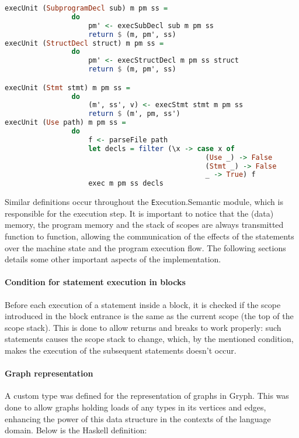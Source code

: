 \begin{lstlisting}[language=Haskell, basicstyle=\footnotesize]
execUnit (SubprogramDecl sub) m pm ss = 
                do 
                    pm' <- execSubDecl sub m pm ss
                    return $ (m, pm', ss)
execUnit (StructDecl struct) m pm ss = 
                do
                    pm' <- execStructDecl m pm ss struct
                    return $ (m, pm', ss)

execUnit (Stmt stmt) m pm ss = 
                do 
                    (m', ss', v) <- execStmt stmt m pm ss
                    return $ (m', pm, ss')
execUnit (Use path) m pm ss = 
                do
                    f <- parseFile path
                    let decls = filter (\x -> case x of    
                                                (Use _) -> False
                                                (Stmt _) -> False
                                                _ -> True) f
                    exec m pm ss decls
\end{lstlisting}

Similar definitions occur throughout the {\texttt Execution.Semantic} module, 
which is responsible for the execution step. It is important to notice
that the (data) memory, the program memory and the stack of scopes
are always transmitted function to function, allowing the communication
of the effects of the statements over the machine state and the
program execution flow. The following sections details some other important aspects of 
the implementation.

\paragraph{Condition for statement execution in blocks}

Before each execution of a statement inside a block, it is checked if
the scope introduced in the block entrance is the same as the
current scope (the top of the scope stack). This is done to
allow returns and breaks to work properly: such statements
causes the scope stack to change, which, by the mentioned condition, makes
the execution of the subsequent statements doesn't occur.

\paragraph{Graph representation}

A custom type was defined for the representation of graphs in Gryph. 
This was done to allow graphs holding loads of any types in its vertices and
edges, enhancing the power of this data structure in the contexts of
the language domain. Below is the Haskell definition:

